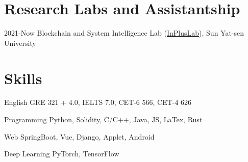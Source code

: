 \documentclass[12pt,letterpaper]{report}
\begin{document}
    \section*{Research Labs and Assistantship}
    \begin{tablist}
        \item[2021-Now] \tab{}Blockchain and System Intelligence Lab (\href{http://www.inpluslab.com}{InPlusLab}), Sun Yat-sen University
    \end{tablist}



    \section*{Skills}
    \begin{tablist}
        \item[English] \tab{}\tab{}GRE 321 + 4.0, IELTS 7.0, CET-6 566, CET-4 626
        \item[Programming] \tab{}Python, Solidity, C/C++, Java, JS, LaTex, Rust
        \item[Web] \tab{}\tab{}SpringBoot, Vue, Django, Applet, Android
        \item[Deep Learning] \tab{}PyTorch, TensorFlow
    \end{tablist}
\end{document}
